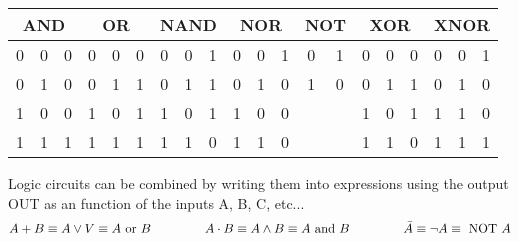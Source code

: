 \begin{center}
	\begin{tabular}{|| c c|c||c c|c||c c|c||c c|c||c|c||c c|c||cc|c||}
		\hline
		\multicolumn{3}{||c||}{AND}&
		\multicolumn{3}{|c||}{OR}&
		\multicolumn{3}{|c||}{NAND}&
		\multicolumn{3}{|c||}{NOR}&
		\multicolumn{2}{|c||}{NOT}&
		\multicolumn{3}{|c||}{XOR}&
		\multicolumn{3}{|c||}{XNOR}\\
		\hline
		0 & 0 & 0 & 
		0 & 0 & 0 & 
		0 & 0 & 1 & 
		0 & 0 & 1 & 
		0 & 1 & 
		0 & 0 & 0 & 
		0 & 0 & 1 \\
		0 & 1 & 0 & 
		0 & 1 & 1 & 
		0 & 1 & 1 & 
		0 & 1 & 0 & 
		1 & 0 & 
		0 & 1 & 1 & 
		0 & 1 & 0 \\
		1 & 0 & 0 & 
		1 & 0 & 1 & 
		1 & 0 & 1 & 
		1 & 0 & 0 & 
		& & 
		1 & 0 & 1 & 
		1 & 1 & 0 \\
		1 & 1 & 1 & 
		1 & 1 & 1 & 
		1 & 1 & 0 & 
		1 & 1 & 0 & 
		&  & 
		1 & 1 & 0 & 
		1 & 1 & 1 \\
		\hline
	\end{tabular}
\end{center}

Logic circuits can be combined by writing them into expressions using the output OUT as an function of the inputs A, B, C, etc...
\begin{align}
A + B \equiv  A \vee V \equiv A \textrm{ or } B  \hspace{1.5cm} A \cdot B \equiv A \wedge B \equiv A \textrm{ and } B \hspace{1.5cm} \bar{A} \equiv \lnot A \equiv \textrm{ NOT } A
\end{align}

